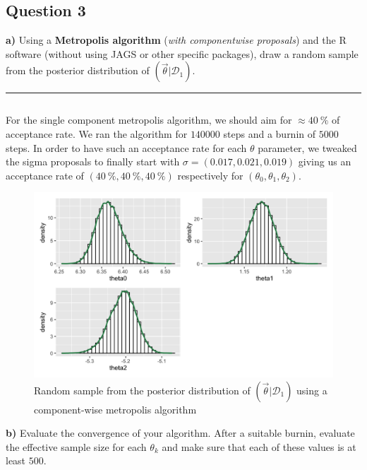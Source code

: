 \subsection*{Question 3}

\textbf{a)} Using a \textbf{Metropolis algorithm} (\textit{with componentwise proposals}) and the R software (without using JAGS or other specific packages), draw a random sample from the posterior distribution of $(\vec{\theta}|\mathcal{D}_1)$.

\begin{center}\rule{6cm}{0.4pt}\end{center}

\inputminted[breaklines]{r}{code/q3a.r}

For the single component metropolis algorithm, we should aim for $\approx \SI{40}{\percent}$ of acceptance rate. We ran the algorithm for $\num{140000}$ steps and a burnin of $\num{5000}$ steps. In order to have such an acceptance rate for each $\theta$ parameter, we tweaked the sigma proposals to finally start with $\sigma = (0.017, 0.021, 0.019)$ giving us an acceptance rate of $(\SI{40}{\percent}, \SI{40}{\percent}, \SI{40}{\percent})$ respectively for $(\theta_0, \theta_1, \theta_2)$.

\begin{figure}[H]
	\centering
	\includegraphics{figures/metropolis_cw_samples.png}
	\caption{Random sample from the posterior distribution of $(\vec{\theta}|\mathcal{D}_1)$ using a component-wise metropolis algorithm}
	\label{fig:metropolis_cw_samples}
\end{figure}

\textbf{b)} Evaluate the convergence of your algorithm. After a suitable burnin, evaluate the effective sample size for each $\theta_k$ and make sure that each of these values is at least $500$.

